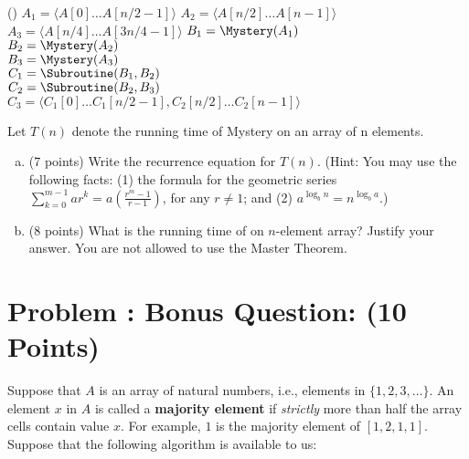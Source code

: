 \documentclass[12pt]{amsart}
\newcounter{pNum}
\newcommand{\problem}[2]{\addtocounter{pNum}{1}
\section*{Problem \arabic{pNum}: #1 (#2 Points)}}
\begin{document}
\smallskip
\begin{algorithm}[H]
\Fn(){}{
\SetAlgoLined
\SetNoFillComment
\DontPrintSemicolon
	$A_{1} = \langle A[0]\ldots A[n/2-1] \rangle$  
	$A_{2} = \langle A[n/2]\ldots A[n-1] \rangle$  
	$A_{3} = \langle A[n/4]\ldots A[3n/4-1] \rangle$  
	$B_1 = \Mystery(A_1)$ \\
	$B_2 = \Mystery(A_2)$ \\
	$B_3 = \Mystery(A_3)$ \\
	$C_1 = \Subroutine(B_1, B_2)$ \\
	$C_2 = \Subroutine(B_2, B_3)$ \\
	$C_3 = \langle C_1[0] \ldots C_1[n/2-1], C_{2}[n/2]\ldots C_{2}[n-1] \rangle$ 
	 
}
\end{algorithm}

\smallskip
Let $T(n)$ denote the running time of Mystery on an array of n elements.

\medskip
\begin{enumerate}[(a)]

\item(7 points) Write the recurrence equation for $T(n)$. (Hint: You may use the following facts: (1) the formula for the geometric series $\sum\limits_{k=0}^{m-1} ar^k = a\left( \frac{r^m - 1}{r - 1}\right)$, for any $r \neq 1$; and (2) $a^{\log_b n} = n^{\log_b a}$.)

\newpage

\item(8 points) What is the running time of \Mystery on $n$-element array? Justify your answer. You are not allowed to use the Master Theorem.


\end{enumerate}

\newpage

\problem{Bonus Question:}{10}

Suppose that $A$ is an array of natural numbers, i.e., elements in $\{1,2,3,\ldots\}$. 
An element $x$ in $A$ is called a \textbf{majority element} if \textit{strictly} more than half the array cells contain value $x$. For example, $1$ is the majority element of $[1,2,1,1]$. Suppose that the following algorithm is available to us:
\end{document}
